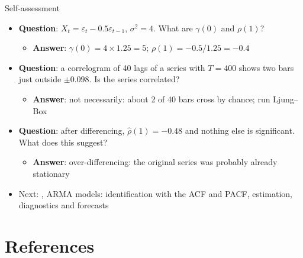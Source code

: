 \begin{frame}{Self-assessment}
\itemsize{\small}
\begin{itemize}
    \item \textbf{Question}: $X_t = \varepsilon_t - 0.5\varepsilon_{t-1}$, $\sigma^2 = 4$. What are $\gamma(0)$ and $\rho(1)$?
    \begin{itemize}
        \item \textbf{Answer}: $\gamma(0) = 4 \times 1.25 = 5$; $\rho(1) = -0.5/1.25 = -0.4$
    \end{itemize}
    \item \textbf{Question}: a correlogram of 40 lags of a series with $T = 400$ shows two bars just outside $\pm 0.098$. Is the series correlated?
    \begin{itemize}
        \item \textbf{Answer}: not necessarily: about 2 of 40 bars cross by chance; run Ljung--Box
    \end{itemize}
    \item \textbf{Question}: after differencing, $\hat\rho(1) = -0.48$ and nothing else is significant. What does this suggest?
    \begin{itemize}
        \item \textbf{Answer}: over-differencing: the original series was probably already stationary
    \end{itemize}
    \item Next: , ARMA models: identification with the ACF and PACF, estimation, diagnostics and forecasts
\end{itemize}
\end{frame}


\section{References}

